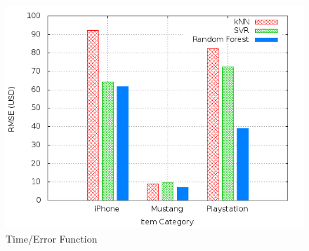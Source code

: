 \begin{figure}
\centering
\includegraphics[scale=0.55]{images/plots/machine_learning/plot_price_regression_rmse.png}
\caption{Time/Error Function}
\label{crowdsourcing_desc_length}
\end{figure}



